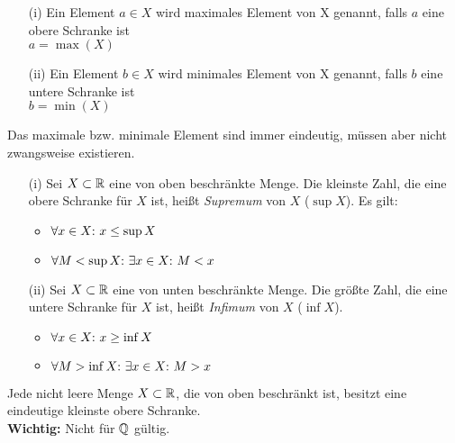 \begin{frameddefn}
	\begin{enumerate}
		\item [(i)] Ein Element $a \in X$ wird maximales Element von X genannt, falls $a$ eine obere Schranke ist\\
		$a = \max (X)$
		\item [(ii)] Ein Element $b \in X$ wird minimales Element von X genannt, falls $b$ eine untere Schranke ist\\
		$b = \min (X)$
	\end{enumerate}
\end{frameddefn}

\begin{framedquest}
	Das maximale bzw. minimale Element sind immer eindeutig, müssen aber nicht zwangsweise existieren.
\end{framedquest}

\begin{frameddefn}
	\begin{enumerate}
		\item [(i)] Sei $X \subset \mathbb{R}$ eine von oben beschränkte Menge. Die kleinste Zahl, die eine obere Schranke für $X$ ist, heißt \textit{Supremum} von $X$ ($\sup X$). Es gilt:
		\begin{itemize}
			\item $\forall x \in X{:}\  x \leq \sup X$
			\item $\forall M < \sup X{:}\  \exists x \in X{:}\  M < x$
		\end{itemize}
		\item [(ii)] Sei $X \subset \mathbb{R}$ eine von unten beschränkte Menge. Die größte Zahl, die eine untere Schranke für $X$ ist, heißt \textit{Infimum} von $X$ ($\inf X$).
		\begin{itemize}
			\item $\forall x \in X{:}\  x \geq \inf X$
			\item $\forall M > \inf X{:}\  \exists x \in X{:}\  M > x$
		\end{itemize}
	\end{enumerate}
\end{frameddefn}


\begin{framedthm} 
	Jede nicht leere Menge $X \subset \mathbb{R}$, die von oben beschränkt ist, besitzt eine eindeutige kleinste obere Schranke.\\
	\textbf{Wichtig:} Nicht für $\mathbb{Q}$ gültig.
\end{framedthm}

